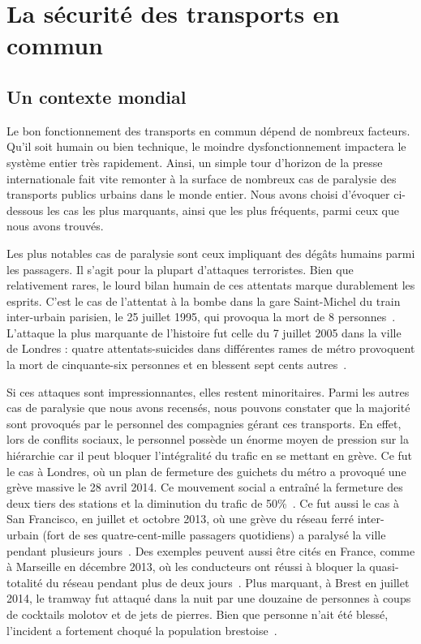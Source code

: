 \section{La sécurité des transports en commun}
    \subsection{Un contexte mondial}
        Le bon fonctionnement des transports en commun dépend de nombreux facteurs. Qu'il soit humain ou bien technique, le moindre dysfonctionnement impactera le système entier très rapidement. Ainsi, un simple tour d'horizon de la presse internationale fait vite remonter à la surface de nombreux cas de paralysie des transports publics urbains dans le monde entier. Nous avons choisi d'évoquer ci-dessous les cas les plus marquants, ainsi que les plus fréquents, parmi ceux que nous avons trouvés. 
             
        Les plus notables cas de paralysie sont ceux impliquant des dégâts humains parmi les passagers. Il s'agit pour la plupart d'attaques terroristes. Bien que relativement rares, le lourd bilan humain de ces attentats marque durablement les esprits.  C'est le cas de l'attentat à la bombe dans la gare Saint-Michel du train inter-urbain parisien, le 25 juillet 1995, qui provoqua la mort de 8 personnes~\cite{stmichel}. L'attaque la plus marquante de l'histoire fut celle du 7 juillet 2005 dans la ville de Londres : quatre attentats-suicides dans différentes rames de métro provoquent la mort de cinquante-six personnes et en blessent sept cents autres~\cite{london_attacks}.
        
        Si ces attaques sont impressionnantes, elles restent minoritaires. Parmi les autres cas de paralysie que nous avons recensés, nous pouvons constater que la majorité sont provoqués par le personnel des compagnies gérant ces transports. En effet, lors de conflits sociaux, le personnel possède un énorme moyen de pression sur la hiérarchie car il peut bloquer l'intégralité du trafic en se mettant en grève.  Ce fut le cas à Londres, où un plan de fermeture des guichets du métro a provoqué une grève massive le 28 avril 2014. Ce mouvement social a entraîné la fermeture des deux tiers des stations et la diminution du trafic de 50\%~\cite{tubeApril}. Ce fut aussi le cas à San Francisco, en juillet et octobre 2013, où une grève du réseau ferré inter-urbain (fort de ses quatre-cent-mille passagers quotidiens) a paralysé la ville pendant plusieurs jours~\cite{SFbart}. Des exemples peuvent aussi être cités en France, comme à Marseille en décembre 2013, où les conducteurs ont réussi à bloquer la quasi-totalité du réseau pendant plus de deux jours~\cite{greve_marseille}. Plus marquant, à Brest en juillet 2014, le tramway fut attaqué dans la  nuit par une douzaine de personnes à coups de cocktails molotov et de jets de pierres. Bien que personne n'ait été blessé, l'incident a fortement choqué la population brestoise~\cite{molotov}.
            

